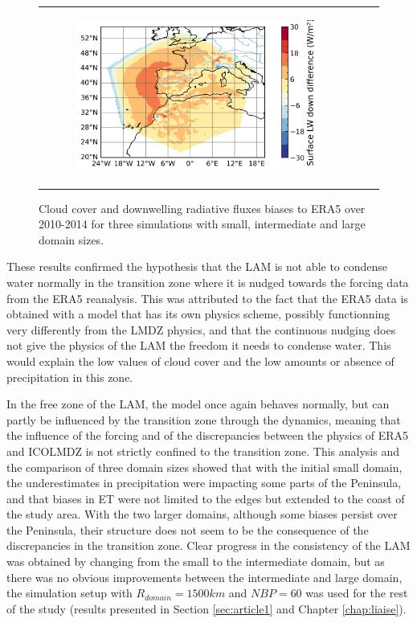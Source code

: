 \begin{figure}[htbp]
\begin{tabular}{ccc}
\begin{subfigure}[b]{0.33\textwidth}
            \includegraphics[width=\textwidth]{images/chap4/domain_size/diff_map_LWdnSFC_era_LAM_2000km_NBP80.png}
        \end{subfigure}
    \end{tabular}
    \caption{Cloud cover and downwelling radiative fluxes biases to ERA5 over 2010-2014 for three simulations with small, intermediate and large domain sizes.}
    \label{fig:domain_size_clouds_ERA_diff_maps}
\end{figure}

These results confirmed the hypothesis that the LAM is not able to condense water normally in the transition zone where it is nudged towards the forcing data from the ERA5 reanalysis. This was attributed to the fact that the ERA5 data is obtained with a model that has its own physics scheme, possibly functionning very differently from the LMDZ physics, and that the continuous nudging does not give the physics of the LAM the freedom it needs to condense water. This would explain the low values of cloud cover and the low amounts or absence of precipitation in this zone.

In the free zone of the LAM, the model once again behaves normally, but can partly be influenced by the transition zone through the dynamics, meaning that the influence of the forcing and of the discrepancies between the physics of ERA5 and ICOLMDZ is not strictly confined to the transition zone.
This analysis and the comparison of three domain sizes showed that with the initial small domain, the underestimates in precipitation were impacting some parts of the Peninsula, and that biases in ET were not limited to the edges but extended to the coast of the study area. With the two larger domains, although some biases persist over the Peninsula, their structure does not seem to be the consequence of the discrepancies in the transition zone. Clear progress in the consistency of the LAM was obtained by changing from the small to the intermediate domain, but as there was no obvious improvements between the intermediate and large domain, the simulation setup with $R_{domain} = 1500 km$ and $NBP = 60$ was used for the rest of the study (results presented in Section \ref{sec:article1} and Chapter \ref{chap:liaise}).

